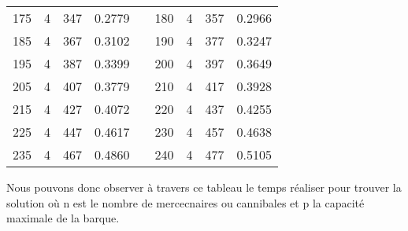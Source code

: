 \documentclass[a4paper, 12pt, french,oneside]{book}
\begin{document}
\begin{table}[!ht]
\begin{tabularx}{\linewidth}{|c|c|c|c|X|c|c|c|c|}
        175          & 4            & 347             & 0.2779                        &  &

        180          & 4            & 357             & 0.2966                                                                                                           \\

        185          & 4            & 367             & 0.3102                        &  &

        190          & 4            & 377             & 0.3247                                                                                                           \\

        195          & 4            & 387             & 0.3399                        &  &

        200          & 4            & 397             & 0.3649                                                                                                           \\

        205          & 4            & 407             & 0.3779                        &  &

        210          & 4            & 417             & 0.3928                                                                                                           \\

        215          & 4            & 427             & 0.4072                        &  &

        220          & 4            & 437             & 0.4255                                                                                                           \\

        225          & 4            & 447             & 0.4617                        &  &

        230          & 4            & 457             & 0.4638                                                                                                           \\

        235          & 4            & 467             & 0.4860                        &  &

        240          & 4            & 477             & 0.5105                                                                                                           \\
        \cline{1-4}\cline{6-9}
    \end{tabularx}
\end{table}
Nous pouvons donc observer à travers ce tableau le temps réaliser pour trouver la solution où n est le nombre de mercecnaires ou cannibales et p la capacité maximale de la barque.
\end{document}
